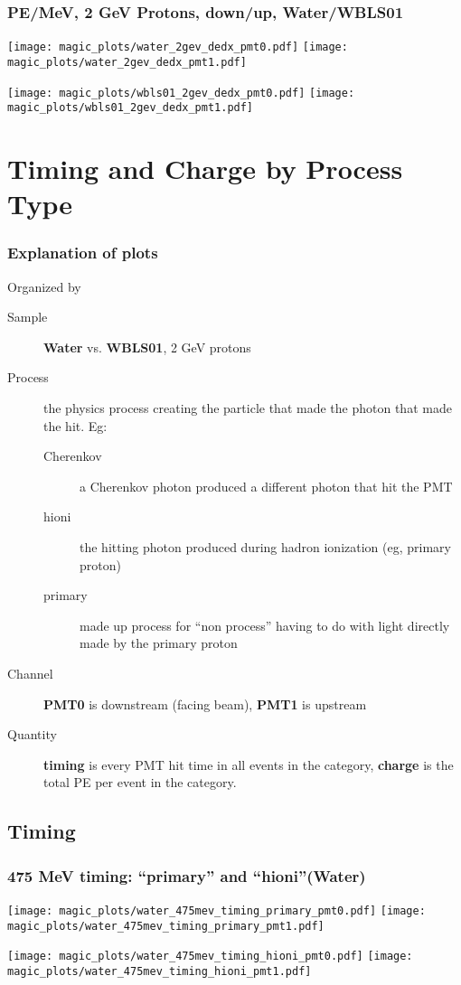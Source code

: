 \documentclass[xcolor=dvipsnames]{beamer}
\begin{document}
\begin{frame}[fragile]
  \frametitle{PE/MeV, 2 GeV Protons, down/up, Water/WBLS01}
  \texttt{[image: magic\_plots/water\_2gev\_dedx\_pmt0.pdf]}%
  \texttt{[image: magic\_plots/water\_2gev\_dedx\_pmt1.pdf]}

  \texttt{[image: magic\_plots/wbls01\_2gev\_dedx\_pmt0.pdf]}%
  \texttt{[image: magic\_plots/wbls01\_2gev\_dedx\_pmt1.pdf]}
\end{frame}


\section{Timing and Charge by Process Type}

\begin{frame}
  \frametitle{Explanation of plots}
  Organized by 
  \begin{description}
  \item[Sample] \textbf{Water} vs. \textbf{WBLS01}, 2 GeV protons
  \item[Process] the physics process creating the particle that made
    the photon that made the hit.  Eg:
    \begin{description}
    \item[Cherenkov] a Cherenkov photon produced a different photon that hit the PMT
    \item[hioni] the hitting photon produced during hadron ionization (eg, primary proton)
    \item[primary] made up process for ``non process'' having to do with light directly made by the primary proton
    \end{description}
  \item[Channel] \textbf{PMT0} is downstream (facing beam), \textbf{PMT1} is upstream
  \item[Quantity] \textbf{timing} is every PMT hit time in all events in the category, \textbf{charge} is the total PE per event in the category.
  \end{description}
\end{frame}



\subsection{Timing}

\begin{frame}[fragile]
  \frametitle{475 MeV timing:  ``primary'' and ``hioni''(Water)}

\texttt{[image: magic\_plots/water\_475mev\_timing\_primary\_pmt0.pdf]}%
\texttt{[image: magic\_plots/water\_475mev\_timing\_primary\_pmt1.pdf]}%

\texttt{[image: magic\_plots/water\_475mev\_timing\_hioni\_pmt0.pdf]}%
\texttt{[image: magic\_plots/water\_475mev\_timing\_hioni\_pmt1.pdf]}%
\end{frame}
\end{document}
